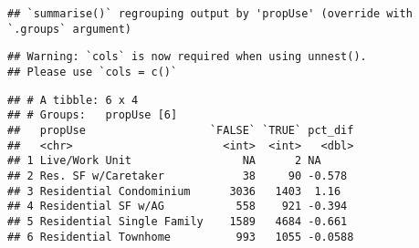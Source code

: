 \documentclass[]{article}
\newenvironment{Shaded}{\begin{snugshade}}{\end{snugshade}}
\newcommand{\DataTypeTok}[1]{\textcolor[rgb]{0.13,0.29,0.53}{#1}}
\newcommand{\DecValTok}[1]{\textcolor[rgb]{0.00,0.00,0.81}{#1}}
\newcommand{\KeywordTok}[1]{\textcolor[rgb]{0.13,0.29,0.53}{\textbf{#1}}}
\newcommand{\NormalTok}[1]{#1}
\newcommand{\OperatorTok}[1]{\textcolor[rgb]{0.81,0.36,0.00}{\textbf{#1}}}
\newcommand{\StringTok}[1]{\textcolor[rgb]{0.31,0.60,0.02}{#1}}
\begin{document}
\begin{Shaded}
\end{Shaded}

\begin{verbatim}
## `summarise()` regrouping output by 'propUse' (override with `.groups` argument)
\end{verbatim}

\begin{verbatim}
## Warning: `cols` is now required when using unnest().
## Please use `cols = c()`
\end{verbatim}

\begin{verbatim}
## # A tibble: 6 x 4
## # Groups:   propUse [6]
##   propUse                   `FALSE` `TRUE` pct_dif
##   <chr>                       <int>  <int>   <dbl>
## 1 Live/Work Unit                 NA      2 NA     
## 2 Res. SF w/Caretaker            38     90 -0.578 
## 3 Residential Condominium      3036   1403  1.16  
## 4 Residential SF w/AG           558    921 -0.394 
## 5 Residential Single Family    1589   4684 -0.661 
## 6 Residential Townhome          993   1055 -0.0588
\end{verbatim}

\begin{Shaded}
\end{Shaded}
\end{document}
